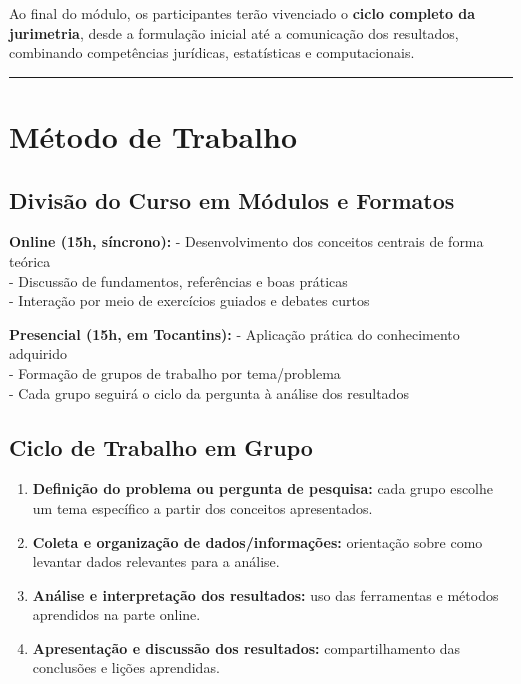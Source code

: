 \documentclass[
  letterpaper,
  DIV=11,
  numbers=noendperiod]{scrreprt}
\providecommand{\tightlist}{%
  \setlength{\itemsep}{0pt}\setlength{\parskip}{0pt}}
\begin{document}
Ao final do módulo, os participantes terão vivenciado o \textbf{ciclo
completo da jurimetria}, desde a formulação inicial até a comunicação
dos resultados, combinando competências jurídicas, estatísticas e
computacionais.

\begin{center}\rule{0.5\linewidth}{0.5pt}\end{center}

\section{Método de Trabalho}\label{muxe9todo-de-trabalho}

\subsection{Divisão do Curso em Módulos e
Formatos}\label{divisuxe3o-do-curso-em-muxf3dulos-e-formatos}

\textbf{Online (15h, síncrono):} - Desenvolvimento dos conceitos
centrais de forma teórica\\
- Discussão de fundamentos, referências e boas práticas\\
- Interação por meio de exercícios guiados e debates curtos

\textbf{Presencial (15h, em Tocantins):} - Aplicação prática do
conhecimento adquirido\\
- Formação de grupos de trabalho por tema/problema\\
- Cada grupo seguirá o ciclo da pergunta à análise dos resultados

\subsection{Ciclo de Trabalho em
Grupo}\label{ciclo-de-trabalho-em-grupo}

\begin{enumerate}
\def\labelenumi{\arabic{enumi}.}
\tightlist
\item
  \textbf{Definição do problema ou pergunta de pesquisa:} cada grupo
  escolhe um tema específico a partir dos conceitos apresentados.\\
\item
  \textbf{Coleta e organização de dados/informações:} orientação sobre
  como levantar dados relevantes para a análise.\\
\item
  \textbf{Análise e interpretação dos resultados:} uso das ferramentas e
  métodos aprendidos na parte online.\\
\item
  \textbf{Apresentação e discussão dos resultados:} compartilhamento das
  conclusões e lições aprendidas.
\end{enumerate}
\end{document}
